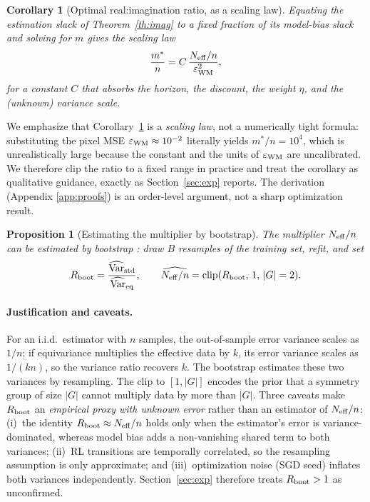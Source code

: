 \documentclass[sigconf,anonymous]{acmart}
\newtheorem{corollary}[theorem]{Corollary}
\newtheorem{proposition}{Proposition}
\begin{document}
\begin{corollary}[Optimal real:imagination ratio, as a scaling law]\label{cor:ratio}
Equating the estimation slack of Theorem~\ref{th:imag} to a fixed fraction
of its model-bias slack and solving for $m$ gives the scaling law
\begin{equation}
  \frac{m^*}{n}=C\,\frac{N_{\rm eff}/n}{\varepsilon_{\rm WM}^{2}},
\end{equation}
for a constant $C$ that absorbs the horizon, the discount, the weight
$\eta$, and the (unknown) variance scale.
\end{corollary}

We emphasize that Corollary~\ref{cor:ratio} is a \emph{scaling law}, not a
numerically tight formula: substituting the pixel MSE
$\varepsilon_{\rm WM}\approx10^{-2}$ literally yields $m^*/n=10^4$, which is
unrealistically large because the constant and the units of
$\varepsilon_{\rm WM}$ are uncalibrated. We therefore clip the ratio to a
fixed range in practice and treat the corollary as qualitative guidance,
exactly as Section~\ref{sec:exp} reports. The derivation (Appendix
\ref{app:proofs}) is an order-level argument, not a sharp optimization
result.

\begin{proposition}[Estimating the multiplier by bootstrap]\label{prop:meff}
The multiplier $N_{\rm eff}/n$ can be estimated by bootstrap
\cite{bootstrap1993}: draw $B$ resamples of the training set, refit, and set
\begin{equation}
  R_{\rm boot}=\frac{\widehat{\operatorname{Var}}_{\rm std}}{\widehat{\operatorname{Var}}_{\rm eq}},
  \qquad
  \widehat{N_{\rm eff}/n}=\operatorname{clip}(R_{\rm boot},\,1,\,|G|=2).
\end{equation}
\end{proposition}

\paragraph{Justification and caveats.}
For an i.i.d.\ estimator with $n$ samples, the out-of-sample error variance
scales as $1/n$; if equivariance multiplies the effective data by $k$, its
error variance scales as $1/(kn)$, so the variance ratio recovers $k$. The
bootstrap \cite{bootstrap1993} estimates these two variances by resampling.
The clip to $[1,|G|]$ encodes the prior that a symmetry group of size $|G|$
cannot multiply data by more than $|G|$. Three caveats make $R_{\rm boot}$ an
\emph{empirical proxy with unknown error} rather than an estimator of
$N_{\rm eff}/n$: (i)~the identity $R_{\rm boot}\approx N_{\rm eff}/n$ holds
only when the estimator's error is variance-dominated, whereas model bias
adds a non-vanishing shared term to both variances; (ii)~RL transitions are
temporally correlated, so the resampling assumption is only approximate; and
(iii)~optimization noise (SGD seed) inflates both variances independently.
Section~\ref{sec:exp} therefore treats $R_{\rm boot}>1$ as unconfirmed.
\end{document}
